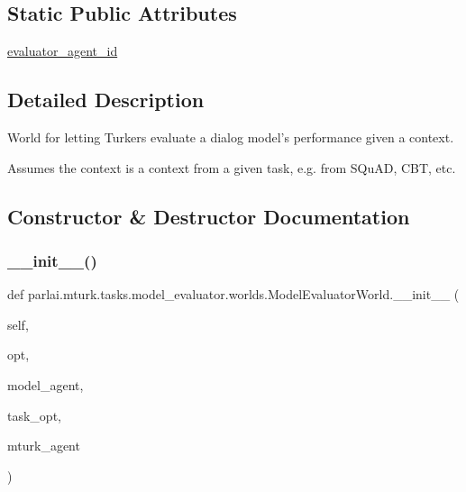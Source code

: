 \subsection*{Static Public Attributes}
\begin{DoxyCompactItemize}
\item 
\hyperlink{classparlai_1_1mturk_1_1tasks_1_1model__evaluator_1_1worlds_1_1ModelEvaluatorWorld_a519a1cdda4c2838d30610bce070cfe11}{evaluator\+\_\+agent\+\_\+id}
\end{DoxyCompactItemize}


\subsection{Detailed Description}
\begin{DoxyVerb}World for letting Turkers evaluate a dialog model's performance given a context.

Assumes the context is a context from a given task, e.g. from SQuAD, CBT, etc.
\end{DoxyVerb}
 

\subsection{Constructor \& Destructor Documentation}
\mbox{\label{classparlai_1_1mturk_1_1tasks_1_1model__evaluator_1_1worlds_1_1ModelEvaluatorWorld_aeb81d4953ba69b9b837d7af56cfd4fed}} 
\subsubsection{\texorpdfstring{\+\_\+\+\_\+init\+\_\+\+\_\+()}{\_\_init\_\_()}}
{\footnotesize\ttfamily def parlai.\+mturk.\+tasks.\+model\+\_\+evaluator.\+worlds.\+Model\+Evaluator\+World.\+\_\+\+\_\+init\+\_\+\+\_\+ (\begin{DoxyParamCaption}\item[{}]{self,  }\item[{}]{opt,  }\item[{}]{model\+\_\+agent,  }\item[{}]{task\+\_\+opt,  }\item[{}]{mturk\+\_\+agent }\end{DoxyParamCaption})}



